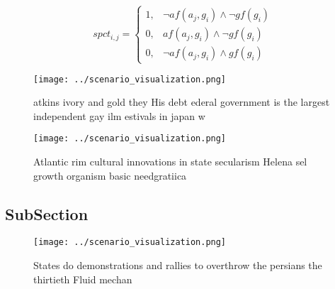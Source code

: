 \documentclass[a4paper]{article}
\begin{document}
\begin{equation}
spct_{i,j} =
\begin{cases}
1, & \text{$\neg af(a_j,g_i) \wedge \neg gf(g_i)$}\\
0, & \text{$af(a_j,g_i) \wedge \neg gf(g_i)$}\\
0, & \text{$\neg af(a_j,g_i) \wedge gf(g_i)$}
\end{cases}
\end{equation}

\begin{figure}
\centering
\texttt{[image: ../scenario\_visualization.png]}
\caption{ atkins ivory and gold they His debt ederal government is the largest independent gay ilm estivals in japan w
}
\end{figure}
 
\begin{figure}
\centering
\texttt{[image: ../scenario\_visualization.png]}
\caption{Atlantic rim cultural innovations in state secularism Helena sel growth organism basic needgratiica
}
\end{figure}
 
\subsection{SubSection}

\begin{figure}
\centering
\texttt{[image: ../scenario\_visualization.png]}
\caption{States do demonstrations and rallies to overthrow the persians the thirtieth Fluid mechan
}
\end{figure}
 
\end{document}
